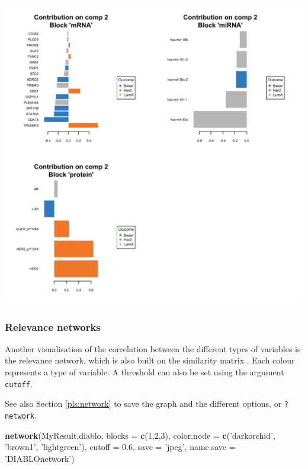 \documentclass[]{book}
\newenvironment{Shaded}{\begin{snugshade}}{\end{snugshade}}
\newcommand{\DataTypeTok}[1]{\textcolor[rgb]{0.13,0.29,0.53}{#1}}
\newcommand{\DecValTok}[1]{\textcolor[rgb]{0.00,0.00,0.81}{#1}}
\newcommand{\FloatTok}[1]{\textcolor[rgb]{0.00,0.00,0.81}{#1}}
\newcommand{\KeywordTok}[1]{\textcolor[rgb]{0.13,0.29,0.53}{\textbf{#1}}}
\newcommand{\NormalTok}[1]{#1}
\newcommand{\StringTok}[1]{\textcolor[rgb]{0.31,0.60,0.02}{#1}}
\begin{document}
\begin{center}\includegraphics[width=0.75\linewidth,]{Figures/06-plotLoadings-max-1} \end{center}

\hypertarget{relevance-networks}{%
\subsubsection{Relevance networks}\label{relevance-networks}}

Another visualisation of the correlation between the different types of variables is the relevance network, which is also built on the similarity matrix \citep{Gon12}. Each colour represents a type of variable. A threshold can also be set using the argument \texttt{cutoff}.

See also Section \ref{pls:network} to save the graph and the different options, or \texttt{?network}.

\begin{Shaded}
\begin{Highlighting}[]
\KeywordTok{network}\NormalTok{(MyResult.diablo, }\DataTypeTok{blocks =} \KeywordTok{c}\NormalTok{(}\DecValTok{1}\NormalTok{,}\DecValTok{2}\NormalTok{,}\DecValTok{3}\NormalTok{),}
        \DataTypeTok{color.node =} \KeywordTok{c}\NormalTok{(}\StringTok{'darkorchid'}\NormalTok{, }\StringTok{'brown1'}\NormalTok{, }\StringTok{'lightgreen'}\NormalTok{), }
        \DataTypeTok{cutoff =} \FloatTok{0.6}\NormalTok{, }\DataTypeTok{save =} \StringTok{'jpeg'}\NormalTok{, }\DataTypeTok{name.save =} \StringTok{'DIABLOnetwork'}\NormalTok{)}
\end{Highlighting}
\end{Shaded}
\end{document}
